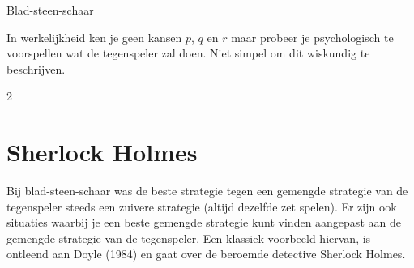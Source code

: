 \begin{lesactiviteit}{Blad-steen-schaar}
\begin{vraagenantwoord}[resume]

\end{vraagenantwoord}

In werkelijkheid ken je geen kansen $p$, $q$ en $r$ maar probeer je psychologisch te voorspellen wat de tegenspeler zal doen. Niet simpel om dit wiskundig te beschrijven.


\end{lesactiviteit}
\vspace{1cm}
\clearpage

\begin{multicols}{2}


\section{Sherlock Holmes}\label{sec:holmes}

Bij blad-steen-schaar was de beste strategie tegen een gemengde strategie van de tegenspeler steeds een zuivere strategie (altijd dezelfde zet spelen). Er zijn ook situaties waarbij je een beste gemengde strategie kunt vinden aangepast aan de gemengde strategie van de tegenspeler. Een klassiek voorbeeld hiervan, is ontleend aan Doyle (1984) en gaat over de beroemde detective Sherlock Holmes.

\end{multicols}

